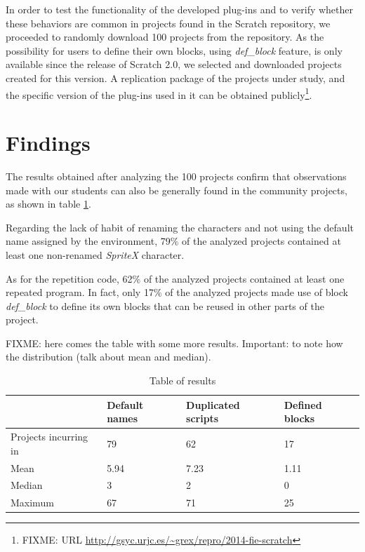\documentclass[conference]{format/IEEEtran}
\begin{document}
In order to test the functionality of the developed plug-ins and to verify whether these behaviors are common in projects found in the Scratch repository, we proceeded to randomly download 100 projects from the repository. As the possibility for users to define their own blocks, using \textit{def\_block} feature, is only available since the release of Scratch 2.0, we selected and downloaded projects created for this version. A replication package of the projects under study, and the specific version of the plug-ins used in it can be obtained publicly\footnote{FIXME: URL \url{http://gsyc.urjc.es/~grex/repro/2014-fie-scratch}}.


\section{Findings}
\label{sec:findings}

The results obtained after analyzing the 100 projects confirm that observations made with our students can also be generally found in the community projects, as shown in table \ref{table:results}.

Regarding the lack of habit of renaming the characters and not using the default name assigned by the environment, 79\% of the analyzed projects contained at least one non-renamed \textit{SpriteX} character.

As for the repetition code, 62\% of the analyzed projects contained at least one repeated program. In fact, only 17\% of the analyzed projects made use of block \textit{def\_block} to define its own blocks that can be reused in other parts of the project. 

FIXME: here comes the table with some more results. Important: to note how the distribution (talk about mean and median).

\begin{table}
\begin{center}
  \begin{tabular}{ | p{2.5cm} | p{1cm} | p{1.2cm} | p{1cm} |}
   \hline
     & Default names & Duplicated scripts & Defined blocks \\ \hline\hline
    Projects incurring in & 79 & 62 & 17 \\ \hline
    Mean & 5.94 & 7.23 & 1.11 \\ \hline
    Median & 3 & 2 & 0 \\ \hline
    Maximum & 67 & 71 & 25 \\
    \hline    
  \end{tabular}
\end{center}
\caption{Table of results}
\label{table:results}
\end{table}
\end{document}
